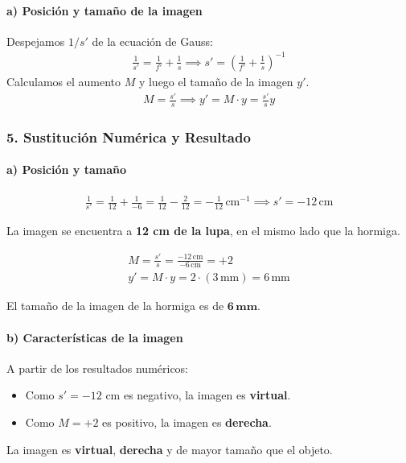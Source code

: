 \paragraph*{a) Posición y tamaño de la imagen}
Despejamos $1/s'$ de la ecuación de Gauss:
\begin{gather}
    \frac{1}{s'} = \frac{1}{f'} + \frac{1}{s} \implies s' = \left(\frac{1}{f'} + \frac{1}{s}\right)^{-1}
\end{gather}
Calculamos el aumento $M$ y luego el tamaño de la imagen $y'$.
\begin{gather}
    M = \frac{s'}{s} \implies y' = M \cdot y = \frac{s'}{s} y
\end{gather}

\subsubsection*{5. Sustitución Numérica y Resultado}
\paragraph*{a) Posición y tamaño}
\begin{gather}
    \frac{1}{s'} = \frac{1}{12} + \frac{1}{-6} = \frac{1}{12} - \frac{2}{12} = -\frac{1}{12} \, \text{cm}^{-1} \implies s' = -12\,\text{cm}
\end{gather}
\begin{cajaresultado}
    La imagen se encuentra a \textbf{12 cm de la lupa}, en el mismo lado que la hormiga.
\end{cajaresultado}
\begin{gather}
    M = \frac{s'}{s} = \frac{-12\,\text{cm}}{-6\,\text{cm}} = +2 \\
    y' = M \cdot y = 2 \cdot (3\,\text{mm}) = 6\,\text{mm}
\end{gather}
\begin{cajaresultado}
    El tamaño de la imagen de la hormiga es de $\boldsymbol{6\,\textbf{mm}}$.
\end{cajaresultado}

\paragraph*{b) Características de la imagen}
A partir de los resultados numéricos:
\begin{itemize}
    \item Como $s'=-12$ cm es negativo, la imagen es \textbf{virtual}.
    \item Como $M=+2$ es positivo, la imagen es \textbf{derecha}.
\end{itemize}
\begin{cajaresultado}
    La imagen es \textbf{virtual}, \textbf{derecha} y de mayor tamaño que el objeto.
\end{cajaresultado}

